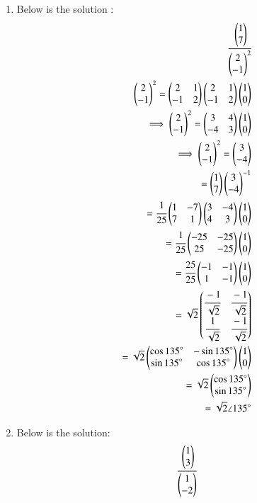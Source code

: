 \begin{enumerate}
    \item Below is the solution :
\begin{align}
    \cfrac{\begin{pmatrix}1 \\ 7\end{pmatrix}}{\begin{pmatrix}2 \\ -1\end{pmatrix}^{2}}
\\
    \begin{pmatrix}2 \\ -1\end{pmatrix}^2 = \begin{pmatrix}2 & 1\\-1 & 2\end{pmatrix}\begin{pmatrix}2 & 1\\-1 & 2\end{pmatrix}\begin{pmatrix}1 \\ 0\end{pmatrix}
\\
    \implies \begin{pmatrix}2 \\ -1\end{pmatrix}^2 = \begin{pmatrix}3 & 4\\-4 & 3\end{pmatrix}\begin{pmatrix}1 \\ 0\end{pmatrix}
\\
    \implies \begin{pmatrix}2 \\ -1\end{pmatrix}^2 = \begin{pmatrix}3 \\-4\end{pmatrix}
\\
    =\begin{pmatrix}1 \\ 7\end{pmatrix}\begin{pmatrix}3\\-4\end{pmatrix}^{-1}
\\
    =\cfrac{1}{25}\begin{pmatrix}1 & -7\\7 & 1\end{pmatrix}\begin{pmatrix}3 & -4\\4 & 3\end{pmatrix}\begin{pmatrix}1 \\ 0\end{pmatrix}
\\
    =\cfrac{1}{25}\begin{pmatrix}-25 & -25\\25 & -25\end{pmatrix}\begin{pmatrix}1 \\ 0\end{pmatrix}
\\
    =\cfrac{25}{25}\begin{pmatrix}-1 & -1\\1 & -1\end{pmatrix}\begin{pmatrix}1 \\ 0\end{pmatrix}
\\
    =\sqrt{2}\begin{pmatrix}\cfrac{-1}{\sqrt{2}} & \cfrac{-1}{\sqrt{2}} \\ \cfrac{1}{\sqrt{2}} & \cfrac{-1}{\sqrt{2}}\end{pmatrix}
\\
    =\sqrt{2}\begin{pmatrix}\cos{135}\degree & -\sin{135}\degree\\ \sin{135}\degree & \cos{135}\degree\end{pmatrix}\begin{pmatrix}1 \\ 0\end{pmatrix}
\\
    =\sqrt{2}\begin{pmatrix}\cos{135}\degree \\ \sin{135}\degree\end{pmatrix}
\\
    =\sqrt{2} \angle 135 \degree
\end{align}
\item Below is the solution:
\begin{align}
    \cfrac{\myvec{1 \\ 3}}{\myvec{1 \\ -2}}

\end{align}
\end{enumerate}
